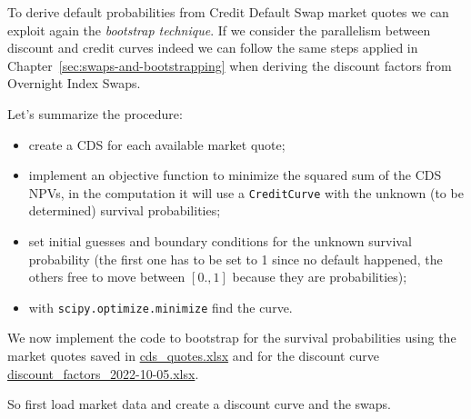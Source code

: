 To derive default probabilities from Credit Default Swap market quotes we can exploit again the \emph{bootstrap technique}. If we consider the parallelism between discount and credit curves indeed we can follow the same steps applied in Chapter~\ref{sec:swaps-and-bootstrapping} when deriving the discount factors from Overnight Index Swaps.

Let's summarize the procedure: 
\begin{itemize}
\tightlist
\item create a CDS for each available market quote;
\item implement an objective function to minimize the squared sum of the CDS NPVs, in the computation it will use a \texttt{CreditCurve} with the unknown (to be determined) survival probabilities;
\item set initial guesses and boundary conditions for the unknown survival probability (the first one has to be set to 1 since no default happened, the others free to move between $[0., 1]$ because they are probabilities);
\item with \texttt{scipy.optimize.minimize} find the curve.
\end{itemize}

We now implement the code to bootstrap for the survival probabilities using the market quotes saved in \href{https://github.com/matteosan1/finance_course/raw/master/input_files/cds_quotes.xlsx}{cds\_quotes.xlsx} and for the discount curve \href{https://github.com/matteosan1/finance_course/raw/master/input_files/discount_factors_2022-10-05.xlsx}{discount\_factors\_2022-10-05.xlsx}.

So first load market data and create a discount curve and the swaps.

